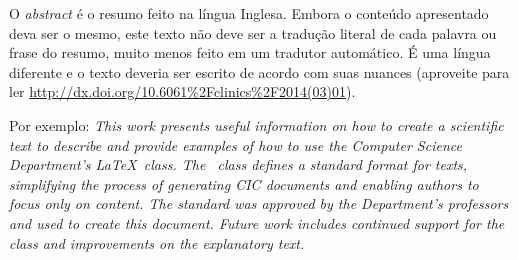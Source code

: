 O \emph{abstract} é o resumo feito na língua Inglesa. Embora o conteúdo apresentado
deva ser o mesmo, este texto não deve ser a tradução literal de cada palavra ou
frase do resumo, muito menos feito em um tradutor automático. É uma língua
diferente e o texto deveria ser escrito de acordo com suas nuances (aproveite para ler
\url{http://dx.doi.org/10.6061%2Fclinics%2F2014(03)01}). 

Por exemplo: \emph{This work presents useful information on how to create a scientific text to describe
and provide examples of how to use the Computer Science Department's \LaTeX\ class. The \unbene\
class defines a standard format for texts, simplifying the process of generating
CIC documents and enabling authors to focus only on content. The standard was approved
by the Department's professors and used to create this document. Future work includes
continued support for the class and improvements on the explanatory text.}